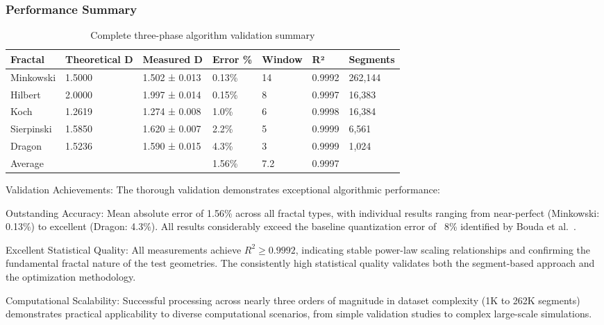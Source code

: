\documentclass[preprint,12pt]{elsarticle}
\def\textbf#1{#1}%
\begin{document}
\subsubsection{Performance Summary}

\begin{table}[H]
\centering
\footnotesize
\begin{tabularx}{\textwidth}{@{}lXXXXXX@{}}
\toprule
\textbf{Fractal} & \textbf{Theoretical D} & \textbf{Measured D} & \textbf{Error \%} & \textbf{Window} & \textbf{R²} & \textbf{Segments} \\
\midrule
Minkowski & 1.5000 & 1.502 ± 0.013 & \textbf{0.13\%} & 14 & 0.9992 & 262,144 \\
Hilbert & 2.0000 & 1.997 ± 0.014 & \textbf{0.15\%} & 8 & 0.9997 & 16,383 \\
Koch & 1.2619 & 1.274 ± 0.008 & \textbf{1.0\%} & 6 & 0.9998 & 16,384 \\
Sierpinski & 1.5850 & 1.620 ± 0.007 & \textbf{2.2\%} & 5 & 0.9999 & 6,561 \\
Dragon & 1.5236 & 1.590 ± 0.015 & \textbf{4.3\%} & 3 & 0.9999 & 1,024 \\
\midrule
\textbf{Average} & & & \textbf{1.56\%} & \textbf{7.2} & \textbf{0.9997} & \\
\bottomrule
\end{tabularx}
\caption{Complete three-phase algorithm validation summary}
\label{tab:complete_validation}
\end{table}

\textbf{Validation Achievements}: The thorough validation demonstrates exceptional algorithmic performance:

\textbf{Outstanding Accuracy}: Mean absolute error of 1.56\% across all fractal types, with individual results ranging from near-perfect (Minkowski: 0.13\%) to excellent (Dragon: 4.3\%). All results considerably exceed the baseline quantization error of ~8\% identified by Bouda et al.~\cite{bouda2016}.

\textbf{Excellent Statistical Quality}: All measurements achieve $R^2 \geq 0.9992$, indicating stable power-law scaling relationships and confirming the fundamental fractal nature of the test geometries. The consistently high statistical quality validates both the segment-based approach and the optimization methodology.

\textbf{Computational Scalability}: Successful processing across nearly three orders of magnitude in dataset complexity (1K to 262K segments) demonstrates practical applicability to diverse computational scenarios, from simple validation studies to complex large-scale simulations.
\end{document}
